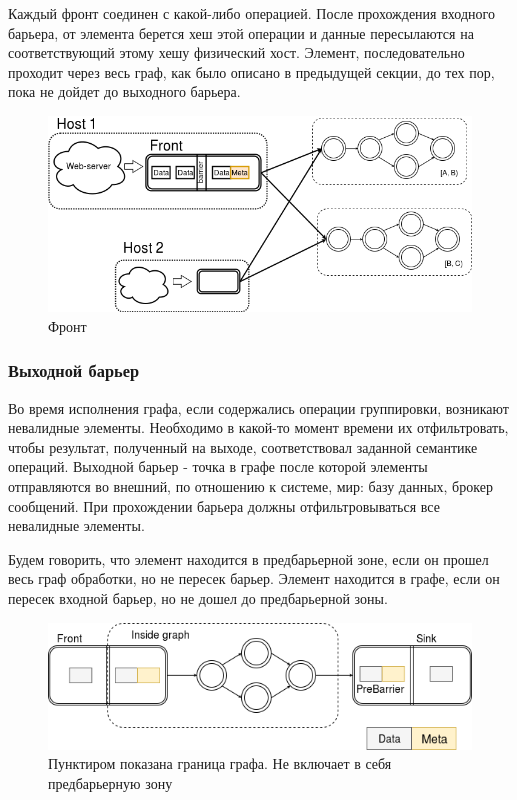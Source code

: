 \documentclass[14pt]{matmex-diploma-custom}
\begin{document}
Каждый фронт соединен с какой-либо операцией. После прохождения входного барьера, от элемента берется хеш этой операции и данные пересылаются на соответствующий этому хешу физический хост. Элемент, последовательно проходит через весь граф, как было описано в предыдущей секции, до тех пор, пока не дойдет до выходного барьера.

\begin{figure}
  \centering
	\includegraphics[width=1.0\textwidth]{pics/front.png}
	\caption{Фронт}
\end{figure}

\subsubsection{Выходной барьер}

Во время исполнения графа, если содержались операции группировки, возникают невалидные элементы. Необходимо в какой-то момент времени их отфильтровать, чтобы результат, полученный на выходе, соответствовал заданной семантике операций. Выходной барьер - точка в графе после которой элементы отправляются во внешний, по отношению к системе, мир: базу данных, брокер сообщений. При прохождении барьера должны отфильтровываться все невалидные элементы.

Будем говорить, что элемент находится в предбарьерной зоне, если он прошел весь граф обработки, но не пересек барьер. Элемент находится в графе, если он пересек входной барьер, но не дошел до предбарьерной зоны.

\begin{figure}
  \centering
	\includegraphics[width=1.0\textwidth]{pics/inside.png}
	\caption{Пунктиром показана граница графа. Не включает в себя предбарьерную зону}
\end{figure}
\end{document}
